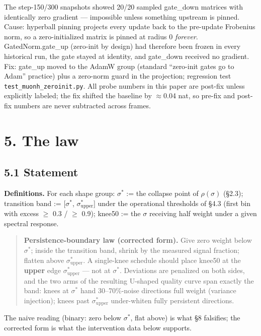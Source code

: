 \documentclass[
]{article}
\begin{document}
The step-150/300 snapshots showed 20/20 sampled gate\_down matrices with
identically zero gradient --- impossible unless something upstream is
pinned. Cause: hyperball pinning projects every update back to the
pre-update Frobenius norm, so a zero-initialized matrix is pinned at
radius 0 \emph{forever}. GatedNorm.gate\_up (zero-init by design) had
therefore been frozen in every historical run, the gate stayed at
identity, and gate\_down received no gradient. Fix: gate\_up moved to
the AdamW group (standard ``zero-init gates go to Adam'' practice) plus
a zero-norm guard in the projection; regression test
\texttt{test\_muonh\_zeroinit.py}. All probe numbers in this paper are
post-fix unless explicitly labeled; the fix shifted the baseline by
\(\approx\){}0.04 nat, so pre-fix and post-fix numbers are never
subtracted across frames.

\section{5. The law}\label{the-law}

\subsection{5.1 Statement}\label{statement}

\textbf{Definitions.} For each shape group: \(\sigma^*\) := the collapse
point of \(\rho(\sigma)\) (§2.3); transition band := {[}\(\sigma^*\),
\(\sigma^*_{\mathrm{upper}}\){]} under the operational thresholds of
§4.3 (first bin with excess \(\geq\) 0.3 / \(\geq\) 0.9); knee50 := the
\(\sigma\) receiving half weight under a given spectral response.

\begin{quote}
\textbf{Persistence-boundary law (corrected form).} Give zero weight
below \(\sigma^*\); inside the transition band, shrink by the measured
signal fraction; flatten above \(\sigma^*_{\mathrm{upper}}\). A
single-knee schedule should place knee50 at the \textbf{upper} edge
\(\sigma^*_{\mathrm{upper}}\) --- not at \(\sigma^*\). Deviations are
penalized on both sides, and the two arms of the resulting U-shaped
quality curve span exactly the band: knees at \(\sigma^*\) hand
30--70\%-noise directions full weight (variance injection); knees past
\(\sigma^*_{\mathrm{upper}}\) under-whiten fully persistent directions.
\end{quote}

The naive reading (binary: zero below \(\sigma^*\), flat above) is what
§8 falsifies; the corrected form is what the intervention data below
supports.
\end{document}
